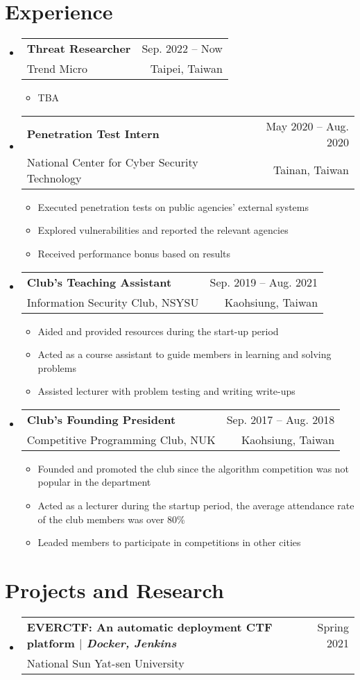 \documentclass[A4,11pt]{article}
\makeatletter
\newcommand{\CVItem}[1]{
  \item\small{
    {#1 \vspace{-2pt}}
  }
}
\newcommand{\CVSubheading}[4]{
  \vspace{-2pt}\item
    \begin{tabular*}{0.97\textwidth}[t]{l@{\extracolsep{\fill}}r}
      \textbf{#1} & #2 \\
      \small#3 & \small #4 \\
    \end{tabular*}\vspace{-7pt}
}
\newcommand{\CVSubHeadingListStart}{\begin{itemize}[leftmargin=0.5cm, label={}]}
\newcommand{\CVSubHeadingListEnd}{\end{itemize}}
\newcommand{\CVItemListStart}{\begin{itemize}}
\newcommand{\CVItemListEnd}{\end{itemize}\vspace{-5pt}}
\makeatother
\begin{document}
  \section{Experience}
    \CVSubHeadingListStart
      \CVSubheading
      {Threat Researcher}{Sep. 2022 -- Now}
      {Trend Micro}{Taipei, Taiwan}
      \CVItemListStart
        \CVItem{TBA}
      \CVItemListEnd
      \CVSubheading
        {Penetration Test Intern}{May 2020 -- Aug. 2020}
        {National Center for Cyber Security Technology}{Tainan, Taiwan}
        \CVItemListStart
          \CVItem{Executed penetration tests on public agencies' external systems}
          \CVItem{Explored vulnerabilities and reported the relevant agencies}
          \CVItem{Received performance bonus based on results}
        \CVItemListEnd
      \CVSubheading
        {Club's Teaching Assistant}{Sep. 2019 -- Aug. 2021}
        {Information Security Club, NSYSU}{Kaohsiung, Taiwan}
        \CVItemListStart
          \CVItem{Aided and provided resources during the start-up period}
          \CVItem{Acted as a course assistant to guide members in learning and solving problems}
          \CVItem{Assisted lecturer with problem testing and writing write-ups}
        \CVItemListEnd
      \CVSubheading
        {Club's Founding President}{Sep. 2017 -- Aug. 2018}
        {Competitive Programming Club, NUK}{Kaohsiung, Taiwan}
        \CVItemListStart
          \CVItem{Founded and promoted the club since the algorithm competition was not popular in the department}
          \CVItem{Acted as a lecturer during the startup period, the average attendance rate of the club members was over 80\%}
          \CVItem{Leaded members to participate in competitions in other cities}
        \CVItemListEnd
    \CVSubHeadingListEnd

\begin{comment}
  Ideally the title of the work should speak for what it is. However if you feel
  like you should explain more about why the project is applicable to this job,
  use item list as is shown in the work experience section.
  \end{comment}
  
  \section{Projects and Research}
    \CVSubHeadingListStart
      \CVSubheading
        {EVERCTF: An automatic deployment CTF platform $|$ \emph{\small{Docker, Jenkins}}}{Spring 2021}
        {National Sun Yat-sen University}{}
    \CVSubHeadingListEnd
\end{document}
